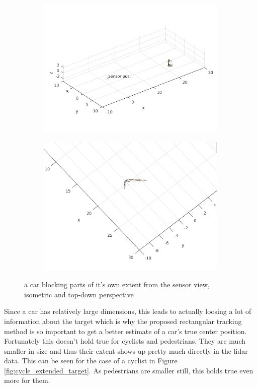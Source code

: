 \begin{figure}[H]
\centering
\begin{subfigure}{.5\textwidth}
  \centering
  \includegraphics[width=1.0\linewidth]{include/images/car_extended_target_ex1.png}
\end{subfigure}%
\begin{subfigure}{.5\textwidth}
  \centering
  \includegraphics[width=1.0\linewidth]{include/images/car_extended_target_ex2.png}
\end{subfigure}
\caption{a car blocking parts of it's own extent from the sensor view, isometric and top-down perspective}
\label{fig:car_extended_target}
\end{figure}

Since a car has relatively large dimensions, this leads to actually loosing a lot of information about the target which is why the proposed rectangular tracking method is so important to get a better estimate of a car's true center position. Fortunately this doesn't hold true for cyclists and pedestrians. They are much smaller in size and thus their extent shows up pretty much directly in the lidar data. This can be seen for the case of a cyclist in Figure \ref{fig:cycle_extended_target}. As pedestrians are smaller still, this holds true even more for them.

